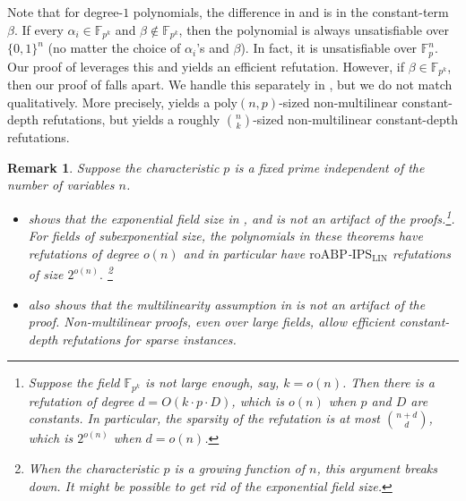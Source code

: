 \documentclass[11pt]{article}
\newtheorem{remark}[theorem]{Remark}
\newcommand{\Boo}{\{0,1 \}}
\newcommand{\F}{\mathbb{F}}
\newcommand{\IPSLIN}{\mathrm{IPS}_{\mathrm{LIN}}}
\begin{document}
\noindent
Note that for degree-$1$ polynomials, the difference in  and  is in the constant-term $\beta$. If every $\alpha_{i} \in \F_{p^{k}}$ and $\beta \notin \F_{p^{k}}$, then the polynomial is always unsatisfiable over $\Boo^{n}$ (no matter the choice of $\alpha_{i}$'s and $\beta$). In fact, it is unsatisfiable over $\F_{p}^{n}$. Our proof of  leverages this and yields an efficient refutation. However, if $\beta \in \F_{p^{k}}$, then our proof of  falls apart. We handle this separately in , but we do not match  qualitatively. More precisely,  yields a $\mathrm{poly}(n,p)$-sized non-multilinear constant-depth refutations, but  yields a roughly $\binom{n}{k}$-sized non-multilinear constant-depth refutations.



\begin{remark}\label{remark: exp field size and multilinearity not artifacts}
    Suppose the characteristic $p$ is a fixed prime independent of the number of variables $n$.
    \begin{itemize}
        \item {} shows that the exponential field size in ,  and  is not an artifact of the proofs.\footnote{Suppose the field $\F_{p^k}$ is not large enough, say, $k = o(n)$. Then there is a refutation of degree $d = O(k\cdot p\cdot D)$, which is $o(n)$ when $p$ and $D$ are constants. In particular, the sparsity of the refutation is at most $\binom{n+d}{d}$, which is $2^{o(n)}$ when $d = o(n)$.}. For fields of subexponential size, the polynomials in these theorems have refutations of degree $o(n)$ and in particular have $\mathrm{roABP}$-$\IPSLIN$ refutations of size $2^{o(n)}.$ \footnote{When the characteristic $p$ is a growing function of $n$, this argument breaks down. It might be possible to get rid of the exponential field size.}
        \item {} also shows that the multilinearity assumption in  is not an artifact of the proof. Non-multilinear proofs, even over large fields, allow efficient constant-depth refutations for sparse instances. 
    \end{itemize}
\end{remark}
\end{document}
